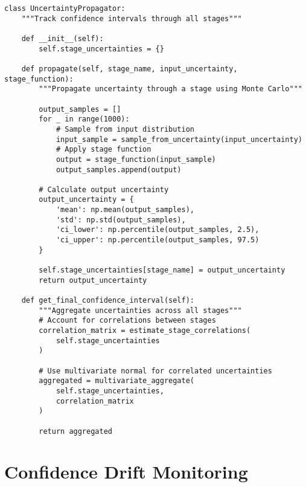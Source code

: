 \documentclass[12pt,oneside]{memoir}
\theoremstyle{plain}
\theoremstyle{definition}
\theoremstyle{remark}
\begin{document}
\begin{lstlisting}[caption={Complete Uncertainty Propagation}]
class UncertaintyPropagator:
    """Track confidence intervals through all stages"""
    
    def __init__(self):
        self.stage_uncertainties = {}
        
    def propagate(self, stage_name, input_uncertainty, stage_function):
        """Propagate uncertainty through a stage using Monte Carlo"""
        
        output_samples = []
        for _ in range(1000):
            # Sample from input distribution
            input_sample = sample_from_uncertainty(input_uncertainty)
            # Apply stage function
            output = stage_function(input_sample)
            output_samples.append(output)
        
        # Calculate output uncertainty
        output_uncertainty = {
            'mean': np.mean(output_samples),
            'std': np.std(output_samples),
            'ci_lower': np.percentile(output_samples, 2.5),
            'ci_upper': np.percentile(output_samples, 97.5)
        }
        
        self.stage_uncertainties[stage_name] = output_uncertainty
        return output_uncertainty
    
    def get_final_confidence_interval(self):
        """Aggregate uncertainties across all stages"""
        # Account for correlations between stages
        correlation_matrix = estimate_stage_correlations(
            self.stage_uncertainties
        )
        
        # Use multivariate normal for correlated uncertainties
        aggregated = multivariate_aggregate(
            self.stage_uncertainties,
            correlation_matrix
        )
        
        return aggregated
\end{lstlisting}

\section{Confidence Drift Monitoring}
\end{document}
